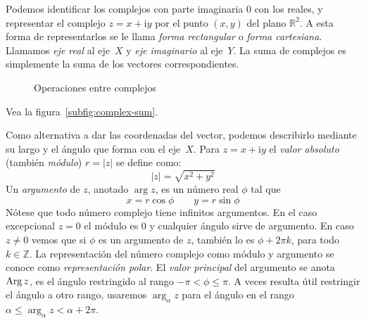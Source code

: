   Podemos identificar los complejos con parte imaginaria \(0\)
  con los reales,
  y representar el complejo \(z = x + \mathrm{i} y\)
  por el punto \((x, y)\) del plano \(\mathbb{R}^2\).
  A esta forma de representarlos
  se le llama \emph{forma rectangular}%
  o \emph{forma cartesiana}.%
  Llamamos \emph{eje real} al eje~\(X\)
  y \emph{eje imaginario} al eje~\(Y\).
  La suma de complejos
  es simplemente la suma de los vectores correspondientes.
  \begin{figure}[ht]
    \centering
    \hspace*{3em}%
    \caption{Operaciones entre complejos}
    \label{fig:complex-operations}
  \end{figure}
  Vea la figura~\ref{subfig:complex-sum}.

  Como alternativa a dar las coordenadas del vector,
  podemos describirlo mediante su largo
  y el ángulo que forma con el eje~\(X\).
  Para \(z = x + \mathrm{i} y\)
  el \emph{valor absoluto}
  (también \emph{módulo}) \(r = \lvert z \rvert\) se define como:%
  \begin{equation}
    \label{eq:complex-modulus}
    \lvert z \rvert
      = \sqrt{x^2 + y^2}
  \end{equation}
  Un \emph{argumento} de \(z\),%
  anotado \(\arg z\),
  es un número real \(\phi\) tal que
  \begin{equation}
    \label{eq:complex-argument}
    x = r \cos \phi \qquad y = r \sin \phi
  \end{equation}
  Nótese que todo número complejo tiene infinitos argumentos.
  En el caso excepcional \(z = 0\)
  el módulo es \(0\) y cualquier ángulo sirve de argumento.
  En caso \(z \ne 0\)
  vemos que si \(\phi\) es un argumento de \(z\),
  también lo es \(\phi + 2 \pi k\),
  para todo \(k \in \mathbb{Z}\).
  La representación del número complejo como módulo y argumento
  se conoce como \emph{representación polar}.%
  El \emph{valor principal} del argumento se anota \(\operatorname{Arg} z\),%
  es el ángulo restringido al rango \(-\pi < \phi \le \pi\).
  A veces resulta útil restringir el ángulo a otro rango,
  usaremos \(\arg_\alpha z\)
  para el ángulo en el rango \(\alpha \le \arg_\alpha z < \alpha + 2 \pi\).

